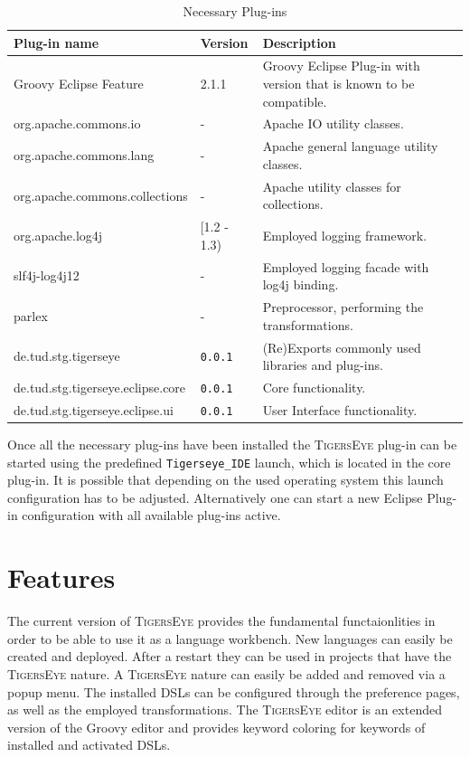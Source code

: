 \documentclass[article,colorback,accentcolor=tud4c]{tudreport}
\newcommand\tiger{%
  \textsc{TigersEye}
}
\newcommand\versionnum{%
  \texttt{0.0.1}
}
\begin{document}
	\begin{table}
	\center
	  \begin{tabular}{l|l|p{}}
		Plug-in name & Version & Description\\ \hline
		Groovy Eclipse Feature & 2.1.1 & Groovy Eclipse Plug-in with version that is known to be compatible.\\
		org.apache.commons.io & - & Apache IO utility classes.\\
		org.apache.commons.lang& - & Apache general language utility classes.\\
		org.apache.commons.collections & - & Apache utility classes for collections.\\
		org.apache.log4j & [1.2 - 1.3) & Employed logging framework.\\
		slf4j-log4j12 & - & Employed logging facade with log4j binding.\\
		parlex & - & Preprocessor, performing the transformations. \\
		de.tud.stg.tigerseye & \versionnum & (Re)Exports commonly used libraries and plug-ins.\\
		de.tud.stg.tigerseye.eclipse.core & \versionnum & Core functionality.\\
		de.tud.stg.tigerseye.eclipse.ui& \versionnum & User Interface functionality.\\		
	  \end{tabular}
	\caption{Necessary Plug-ins}\label{lst:dependencies}
	\end{table}

	Once all the necessary plug-ins have been installed the \tiger plug-in can be started using the predefined \texttt{Tigerseye\_IDE} launch, which is located in the core plug-in. 
	It is possible that depending on the used operating system this launch configuration has to be adjusted. Alternatively one can start a new Eclipse Plug-in configuration with all available plug-ins active.
	

  \section{Features}

	The current version of \tiger provides the fundamental functaionlities in order to be able to use it as a language workbench. New languages can easily be created and deployed. After a restart they can be used in projects that have the \tiger nature. A \tiger nature can easily be added and removed via a popup menu. The installed DSLs can be configured through the preference pages, as well as the employed transformations. The \tiger editor is an extended version of the Groovy editor and provides keyword coloring for keywords of installed and activated DSLs.
	
\end{document}
